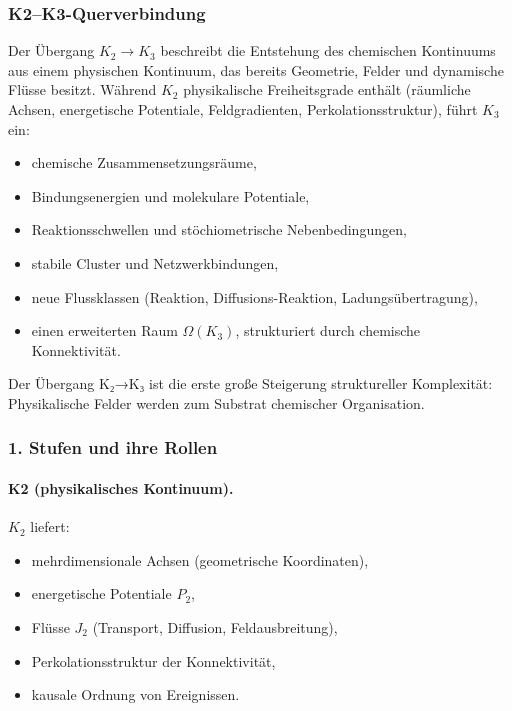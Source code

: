 
\subsubsection{K2–K3-Querverbindung}
\label{sec:crossk-k2-k3}

Der Übergang $K_2 \rightarrow K_3$ beschreibt die Entstehung des chemischen
Kontinuums aus einem physischen Kontinuum, das bereits Geometrie, Felder und
dynamische Flüsse besitzt. Während $K_2$ physikalische Freiheitsgrade enthält
(räumliche Achsen, energetische Potentiale, Feldgradienten, Perkolationsstruktur),
führt $K_3$ ein:
\begin{itemize}
  \item chemische Zusammensetzungsräume,
  \item Bindungsenergien und molekulare Potentiale,
  \item Reaktionsschwellen und stöchiometrische Nebenbedingungen,
  \item stabile Cluster und Netzwerkbindungen,
  \item neue Flussklassen (Reaktion, Diffusions-Reaktion, Ladungsübertragung),
  \item einen erweiterten Raum $\Omega(K_3)$, strukturiert durch chemische
        Konnektivität.
\end{itemize}

Der Übergang K₂→K₃ ist die erste große Steigerung struktureller Komplexität:
Physikalische Felder werden zum Substrat chemischer Organisation.

\subsubsection{1. Stufen und ihre Rollen}

\paragraph{K2 (physikalisches Kontinuum).}
$K_2$ liefert:
\begin{itemize}
  \item mehrdimensionale Achsen (geometrische Koordinaten),
  \item energetische Potentiale $P_2$,
  \item Flüsse $J_2$ (Transport, Diffusion, Feldausbreitung),
  \item Perkolationsstruktur der Konnektivität,
  \item kausale Ordnung von Ereignissen.
\end{itemize}

